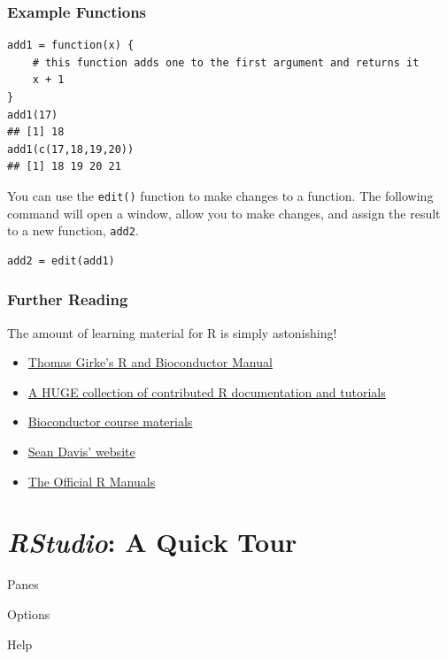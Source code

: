 \documentclass[]{article}
\theoremstyle{definition}
\theoremstyle{definition}
\theoremstyle{remark}
\begin{document}
\subsubsection{Example Functions}\label{example-functions}

\begin{verbatim}
add1 = function(x) {
    # this function adds one to the first argument and returns it
    x + 1
}
add1(17)
## [1] 18
add1(c(17,18,19,20))
## [1] 18 19 20 21
\end{verbatim}

You can use the \texttt{edit()} function to make changes to a function.
The following command will open a window, allow you to make changes, and
assign the result to a new function, \texttt{add2}.

\begin{verbatim}
add2 = edit(add1)
\end{verbatim}

\subsubsection{Further Reading}\label{further-reading}

The amount of learning material for R is simply astonishing!

\begin{itemize}
\item
  {\href{http://manuals.bioinformatics.ucr.edu/home/R_BioCondManual}{Thomas
  Girke's R and Bioconductor Manual}}
\item
  {\href{http://cran.r-project.org/other-docs.html}{A HUGE collection of
  contributed R documentation and tutorials}}
\item
  {\href{http://www.bioconductor.org/help/course-materials/}{Bioconductor
  course materials}}
\item
  {\href{http://watson.nci.nih.gov/~sdavis/}{Sean Davis' website}}
\item
  {\href{http://cran.r-project.org/manuals.html}{The Official R
  Manuals}}
\end{itemize}

\section{\texorpdfstring{\emph{RStudio}: A Quick
Tour}{RStudio: A Quick Tour}}\label{rstudio-a-quick-tour}

Panes

Options

Help
\end{document}
